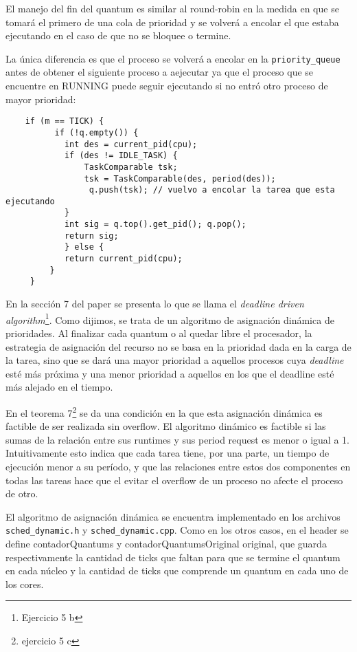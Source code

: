 El manejo del fin del quantum es similar al round-robin en la medida  en que se tomar\'a el primero de una cola de prioridad y se volver\'a a encolar el que estaba ejecutando en el caso de que no se bloquee o termine.

La \'unica diferencia es que el proceso se volver\'a a encolar en la \verb+priority_queue+ antes de obtener el siguiente proceso a aejecutar ya que el proceso que se encuentre en RUNNING puede seguir ejecutando si no entr\'o otro proceso de mayor prioridad:

\begin{verbatim}
    if (m == TICK) {
          if (!q.empty()) {
            int des = current_pid(cpu);
            if (des != IDLE_TASK) {
                TaskComparable tsk;
                tsk = TaskComparable(des, period(des));
                 q.push(tsk); // vuelvo a encolar la tarea que esta ejecutando
            }
            int sig = q.top().get_pid(); q.pop();
            return sig;
            } else {
            return current_pid(cpu);
         }
     }
\end{verbatim}

En la secci\'on 7 del paper se presenta lo que se llama el \textit{deadline driven algorithm}\footnote{Ejercicio 5 b}. Como dijimos, se trata de un algoritmo de asignaci\'on din\'amica de prioridades. Al finalizar cada quantum o al quedar libre el procesador, la estrategia de asignaci\'on del recurso no se basa en la prioridad dada en la carga de la tarea, sino que se dar\'a una mayor prioridad a aquellos procesos cuya \textit{deadline} est\'e m\'as pr\'oxima y una menor prioridad a aquellos en los que el deadline est\'e m\'as alejado en el tiempo.

En el teorema 7\footnote{ejercicio 5 c} se da una condici\'on en la que esta asignaci\'on din\'amica es factible de ser realizada sin overflow. El algoritmo din\'amico es factible si las sumas de la relaci\'on entre sus runtimes y sus period request es menor o igual a 1. Intuitivamente esto indica que cada tarea tiene, por una parte, un tiempo de ejecuci\'on menor a su per\'iodo, y que las relaciones entre estos dos componentes en todas las tareas hace que el evitar el overflow de un proceso no afecte el proceso de otro.

El algoritmo de asignaci\'on din\'amica se encuentra implementado en los archivos \verb+sched_dynamic.h+ y \verb+sched_dynamic.cpp+. Como en los otros casos, en el header se define contadorQuantums y contadorQuantumsOriginal original, que guarda respectivamente la cantidad de ticks que faltan para que se termine el quantum en cada n\'ucleo y la cantidad de ticks que comprende un quantum en cada uno de los cores.

